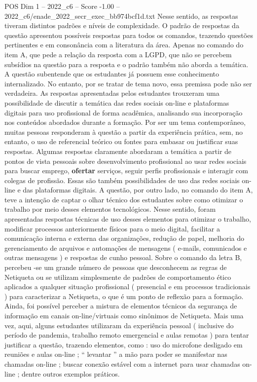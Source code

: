 \begin{textsample}{POS Dim 1 – 2022\_c6 – Score -1.00 – 2022\_c6/enade\_2022\_secr\_exec\_bb974bcf1d.txt}
Nesse sentido, as respostas tiveram distintos padrões e níveis de complexidade.
O padrão de respostas da questão apresentou possíveis respostas para todos os comandos, trazendo questões pertinentes e em consonância com a literatura da área.
Apenas no comando do item A, que pede a relação da resposta com a LGPD, que não se percebem subsídios na questão para a resposta e o padrão também não aborda a temática.
A questão subentende que os estudantes já possuem esse conhecimento internalizado.
No entanto, por se tratar de tema novo, essa premissa pode não ser verdadeira.
As respostas apresentadas pelos estudantes trouxeram uma possibilidade de discutir a temática das redes sociais on-line e plataformas digitais para uso profissional de forma acadêmica, analisando sua incorporação nos conteúdos abordados durante a formação.
Por ser um tema contemporâneo, muitas pessoas responderam à questão a partir da experiência prática, sem, no entanto, o uso de referencial teórico ou fontes para embasar ou justificar suas respostas.
Algumas respostas claramente abordaram a temática a partir de pontos de vista pessoais sobre desenvolvimento profissional ao usar redes sociais para buscar emprego, \textbf{ofertar} serviços, seguir perfis profissionais e interagir com colegas de profissão.
Essas são também possibilidades de uso das redes sociais on-line e das plataformas digitais.
A questão, por outro lado, no comando do item A, teve a intenção de captar o olhar técnico dos estudantes sobre como otimizar o trabalho por meio desses elementos tecnológicos.
Nesse sentido, foram apresentadas respostas técnicas de uso desses elementos para otimizar o trabalho, modificar processos anteriormente físicos para o meio digital, facilitar a comunicação interna e externa das organizações, redução de papel, melhoria do gerenciamento de arquivos e automações de mensagens ( e-mails, comunicados e outras mensagens ) e respostas de cunho pessoal.
Sobre o comando da letra B, percebeu -se um grande número de pessoas que desconhecem as regras de Netiqueta ou se utilizam simplesmente de padrões de comportamento ético aplicados a qualquer situação profissional ( presencial e em processos tradicionais ) para caracterizar a Netiqueta, o que é um ponto de reflexão para a formação.
Ainda, foi possível perceber a mistura de elementos técnicos da segurança de informação em canais on-line/virtuais como sinônimos de Netiqueta.
Mais uma vez, aqui, alguns estudantes utilizaram da experiência pessoal ( inclusive do período de pandemia, trabalho remoto emergencial e aulas remotas ) para tentar justificar a questão, trazendo elementos, como : uso do microfone desligado em reuniões e aulas on-line ; “ levantar ” a mão para poder se manifestar nas chamadas on-line ; buscar conexão estável com a internet para usar chamadas on-line ; dentre outros exemplos práticos.

\end{textsample}

